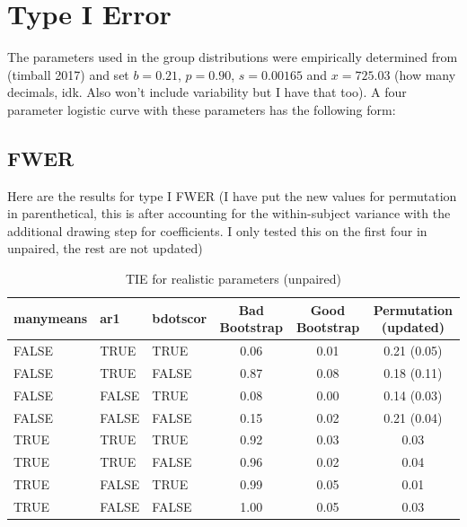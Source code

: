 \documentclass{article}
\begin{document}
\section{Type I Error}

The parameters used in the group distributions were empirically determined from (timball 2017) and set $b = 0.21$, $p = 0.90$, $s = 0.00165$ and $x = 725.03$ (how  many decimals, idk. Also won't include variability but I have that too). A four parameter logistic curve with these parameters has the following form:






\subsection{FWER}

Here are the results for type I FWER (I have put the new values for permutation in parenthetical, this is after accounting for the within-subject variance with the additional drawing step for coefficients. I only tested this on the first four in unpaired, the rest are not updated)

\begin{table}[H]
\centering
\begin{tabular}{lllccc}
  \hline
  manymeans & ar1 & bdotscor &  Bad Bootstrap & Good Bootstrap & Permutation (updated) \\ 
  \hline
FALSE & TRUE & TRUE & 0.06 & 0.01 & 0.21  (0.05) \\ 
  FALSE & TRUE & FALSE & 0.87 & 0.08 & 0.18  (0.11) \\ 
  FALSE & FALSE & TRUE & 0.08 & 0.00 & 0.14  (0.03) \\ 
  FALSE & FALSE & FALSE & 0.15 & 0.02 & 0.21  (0.04) \\ 
  TRUE & TRUE & TRUE & 0.92 & 0.03 & 0.03 \\ 
  TRUE & TRUE & FALSE & 0.96 & 0.02 & 0.04 \\ 
  TRUE & FALSE & TRUE & 0.99 & 0.05 & 0.01 \\ 
  TRUE & FALSE & FALSE & 1.00 & 0.05 & 0.03 \\  
   \hline
\end{tabular}
\caption{TIE for realistic parameters (unpaired)}
\end{table}
\end{document}
